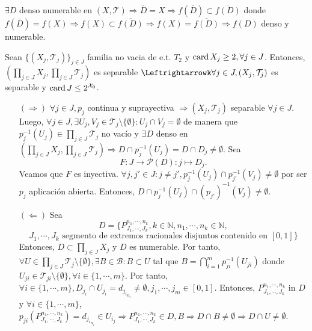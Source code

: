 \begin{dem}
  $\exists D$ denso numerable en $( X, \mathcal{T} ) \Rightarrow \overline{D} = X \Rightarrow f(\overline{D}) \subset \overline{f(D)}$ donde $f(\overline{D}) = f(X) \Rightarrow f(X) \subset \overline{f(D)} \Rightarrow f(X) = \overline{f(D)} \Rightarrow f(D)$ denso y numerable.
\end{dem}

\begin{prop}
  Sean $\{ ( X_{j}, \mathcal{T}_{j} ) \}_{j \in J}$ familia no vacia de e.t. $T_{2}$ y $\operatorname{card} X_{j} \geq 2, \forall j \in J$. Entonces, $( \prod_{j \in J} X_{j}, \prod_{j \in J} \mathcal{T}_{j} )$ es separable $ \Leftrightarrowk \forall j \in J, ( X_{j}, \mathcal{T}_{j} )$ es separable y $\operatorname{card} J \leq 2^{\mathcal{X}_{0}}$.
\end{prop}

\begin{dem}
  \begin{enumerate}[label=(\roman*)]
    \item []
    \item [$(\Rightarrow)$] $\forall j \in J, p_{j} $ continua y suprayectiva $\Rightarrow ( X_{j}, \mathcal{T}_{j} )$ separable $\forall j \in J$. Luego, $\forall j \in J, \exists U_{j}, V_{j} \in \mathcal{T}_{j} \setminus \{  \emptyset \}  : U_{j} \cap V_{j} = \emptyset$ de manera que $p_{j}^{-1}(U_{j}) \in \prod_{j \in J} \mathcal{T}_{j}$ no vacío y $\exists D$ denso en $( \prod_{j \in J} X_{j}, \prod_{j \in J} \mathcal{T}_{j} ) \Rightarrow D \cap p_{j}^{-1}(U_{j}) = D \cap D_{j} \neq \emptyset$. Sea
      \[
        F: J \to \mathcal{P}(D) : j \mapsto D_{j}.
      \]
      Veamos que $F$ es inyectiva. $\forall j, j' \in J : j \neq j', p_{j}^{-1}(U_{j}) \cap p_{j'}^{-1}(V_{j}) \neq \emptyset$ por ser $p_{j}$ aplicación abierta. Entonces, $D \cap p_{j}^{-1}(U_{j}) \cap (p_{j'})^{-1}(V_{j}) \neq \emptyset$.
    \item [$(\Leftarrow)$] Sea
      \[
        D = \{  P^{n_{1}, \cdots, n_{k}}_{J_{1}, \cdots, J_{k}}, k \in \mathbb{N}, n_{1}, \cdots, n_{k} \in \mathbb{N},
      \]
      \[
         J_{1}, \cdots, J_{k} \text{ segmento de extremos racionales disjuntos contenido en } [0,1] \}
      \]
      Entonces, $D \subset \prod_{j \in J} X_{j}$ y $D$ es numerable. Por tanto, $\forall U \in \prod_{j \in J} \mathcal{T}_{j} \setminus \{ \emptyset \}, \exists B \in \mathcal{B} : B \subset U$ tal que $B = \bigcap_{i = 1}^{m} p_{ji}^{-1}(U_{ji})$ donde $U_{ji} \in \mathcal{T}_{ji} \setminus \{ \emptyset \}, \forall i \in \{  1, \cdots, m \}$. Por tanto, $\forall i \in \{  1, \cdots, m \}, D_{j_i} \cap U_{j_i} = d_{j_i}_{n_i} \neq \emptyset, j_{1}, \cdots, j_{m} \in [0, 1]$. Entonces, $P^{n_{1}, \cdots, n_{k}}_{J_{1}, \cdots, J_{k}}$ in $D$ y $\forall i \in \{ 1, \cdots, m \}$, $p_{ji}(P^{n_{1}, \cdots, n_{k}}_{J_{1}, \cdots, J_{k}}) = d_{j_{i}}_{n_{i}} \in U_{i_{j}} \Rightarrow P^{n_{1}, \cdots, n_{k}}_{J_{1}, \cdots, J_{k}} \in D, B \Rightarrow D \cap B \neq \emptyset \Rightarrow D \cap U \neq \emptyset$.
  \end{enumerate}
\end{dem}
